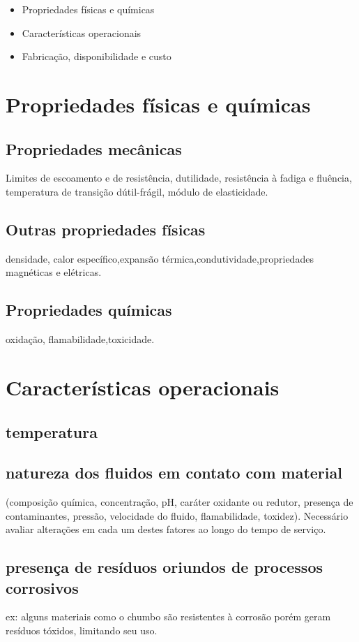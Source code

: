 \begin{itemize}
	\item Propriedades físicas e químicas 
	\item Características operacionais
	\item Fabricação, disponibilidade e custo
	
\end{itemize}


\section{Propriedades físicas e químicas}

\subsection*{Propriedades mecânicas}
Limites de escoamento e de resistência, dutilidade, resistência à fadiga e fluência, temperatura de transição dútil-frágil, módulo de elasticidade.

\subsection{Outras propriedades físicas}
densidade, calor específico,expansão térmica,condutividade,propriedades magnéticas e elétricas.


\subsection*{Propriedades químicas}
oxidação, flamabilidade,toxicidade.

\section{Características operacionais}

\subsection*{temperatura}
\subsection*{natureza dos fluidos em contato com material}
(composição química, concentração, pH, caráter oxidante ou redutor, presença de contaminantes, pressão, velocidade do fluido, flamabilidade, toxidez). Necessário avaliar alterações em cada um destes fatores ao longo do tempo de serviço.

\subsection*{presença de resíduos oriundos de processos corrosivos}
ex: alguns materiais como o chumbo são resistentes à corrosão porém geram resíduos tóxidos, limitando seu uso.

